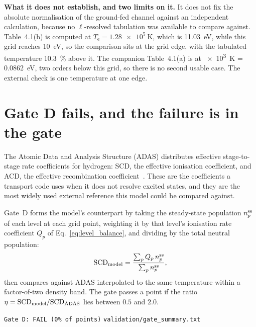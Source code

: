 \textbf{What it does not establish, and two limits on it.} It does not fix the
absolute normalisation of the ground-fed channel against an independent
calculation, because no $\ell$-resolved tabulation was available to compare
against. Table~4.1(b) is computed at $T_\mathrm{e} = \SI{1.28e5}{\kelvin}$,
which is \SI{11.03}{\electronvolt}, while this grid reaches
\SI{10}{\electronvolt}, so the comparison sits at the grid edge, with the
tabulated temperature \SI{10.3}{\percent} above it. The companion
Table~4.1(a) is at \SI{e3}{\kelvin} =
\SI{0.0862}{\electronvolt}, two orders below this grid, so there is no second
usable case. The external check is one temperature at one edge.

\section{Gate D fails, and the failure is in the gate}
\label{sec:gate_d}

The Atomic Data and Analysis Structure (ADAS) distributes effective
stage-to-stage rate coefficients for hydrogen: SCD, the effective ionisation
coefficient, and ACD, the effective recombination coefficient~\cite{Summers2006}.
These are the coefficients a transport code uses when it does not resolve
excited states, and they are the most widely used external reference this model
could be compared against.

Gate~D forms the model's counterpart by taking the steady-state population
$n_p^{\rm ss}$ of each level at each grid point, weighting it by that level's
ionisation rate coefficient $Q_p$ of Eq.~\eqref{eq:level_balance}, and dividing
by the total neutral population:
\begin{equation}
  {\rm SCD}_{\rm model}
  = \frac{\sum_p Q_p\,n_p^{\rm ss}}{\sum_p n_p^{\rm ss}},
  \label{eq:scd_model}
\end{equation}
then compares against ADAS interpolated to the same temperature within a
factor-of-two density band. The gate passes a point if the ratio
$\eta = {\rm SCD}_{\rm model}/{\rm SCD}_{\rm ADAS}$ lies between $0.5$ and $2.0$.

\begin{center}
\texttt{Gate D: FAIL  (0\% of points)} \hfill \texttt{validation/gate\_summary.txt}
\end{center}

